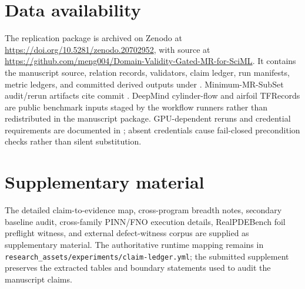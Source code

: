 \documentclass[preprint,12pt,authoryear]{elsarticle}
\begin{document}
\section*{Data availability}
The replication package is archived on Zenodo at \url{https://doi.org/10.5281/zenodo.20702952}, with source at \url{https://github.com/meng004/Domain-Validity-Gated-MR-for-SciML}. It contains the manuscript source, relation records, validators, claim ledger, run manifests, metric ledgers, and committed derived outputs under . Minimum-MR-SubSet audit/rerun artifacts cite commit . DeepMind cylinder-flow and airfoil TFRecords are public benchmark inputs staged by the workflow runners rather than redistributed in the manuscript package. GPU-dependent reruns and credential requirements are documented in ; absent credentials cause fail-closed precondition checks rather than silent substitution.

\section*{Supplementary material}
\label{sec:supplementary-material}
The detailed claim-to-evidence map, cross-program breadth notes, secondary baseline audit, cross-family PINN/FNO execution details, RealPDEBench foil preflight witness, and external defect-witness corpus are supplied as supplementary material. The authoritative runtime mapping remains in \texttt{research\_assets/experiments/claim-ledger.yml}; the submitted supplement preserves the extracted tables and boundary statements used to audit the manuscript claims.



\end{document}

